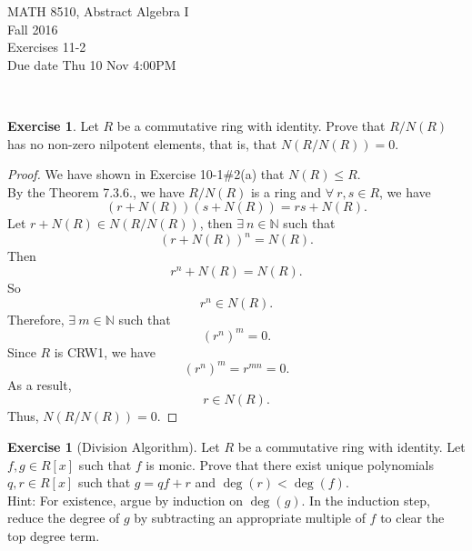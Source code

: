 \documentclass{amsart}
\newcommand{\bbn}{\mathbb{N}}
\theoremstyle{plain}
\theoremstyle{definition}
\newtheorem{exer}[lem]{Exercise}
\begin{document}
\noindent MATH 8510, Abstract Algebra I \\
Fall 2016\\
Exercises 11-2\\
Due date Thu 10 Nov 4:00PM

\

%
%

\begin{exer}
Let $R$ be a commutative ring with identity.
Prove that $R/N(R)$ has no non-zero nilpotent elements, that is, that $N(R/N(R))=0$.
\begin{proof}
  We have shown in Exercise 10-1$\#$2(a) that $N(R) \leq R$.\\
  By the Theorem 7.3.6., we have $R/N(R)$ is a ring and $\forall\ r,s \in R$, we have
  \[\left(r+N(R)\right)\left(s+N(R)\right) = rs + N(R).\]
  Let $r + N(R) \in N(R/N(R))$, then $\exists \ n \in \bbn$ such that 
  \[\left(r + N(R)\right)^n = N(R).\]
  Then
  \[r^n +  N(R) = N(R).\]
  So
  \[r^n \in N(R).\]
  Therefore, $\exists \ m \in \bbn$ such that 
  \[(r^n)^m = 0.\]
  Since $R$ is CRW1, we have
  \[(r^n)^m = r^{mn}= 0.\]
  As a result,
  \[r\in N(R).\]
  Thus, $N(R/N(R))=0$.
\end{proof}
\end{exer}

\begin{exer}[Division Algorithm]
Let $R$ be a commutative ring with identity.
Let $f,g\in R[x]$ such that $f$ is monic.
Prove that there exist unique polynomials $q,r\in R[x]$ such that
$g=qf+r$ and $\deg(r)<\deg(f)$.
\\
Hint: For existence, argue by induction on $\deg(g)$. In the induction step, reduce the degree of $g$ by subtracting an appropriate multiple of $f$ to clear the top degree term.
\end{exer}
\end{document}
